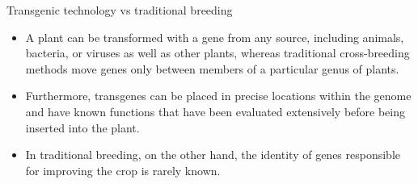 \documentclass[ignorenonframetext,aspectratio=169]{beamer}
\providecommand{\tightlist}{%
  \setlength{\itemsep}{0pt}\setlength{\parskip}{0pt}}
\begin{document}
\begin{frame}{Transgenic technology vs traditional breeding}
\protect\hypertarget{transgenic-technology-vs-traditional-breeding}{}

\begin{itemize}
\tightlist
\item
  A plant can be transformed with a gene from any source, including
  animals, bacteria, or viruses as well as other plants, whereas
  traditional cross-breeding methods move genes only between members of
  a particular genus of plants.
\item
  Furthermore, transgenes can be placed in precise locations within the
  genome and have known functions that have been evaluated extensively
  before being inserted into the plant.
\item
  In traditional breeding, on the other hand, the identity of genes
  responsible for improving the crop is rarely known.
\end{itemize}

\end{frame}
\end{document}
